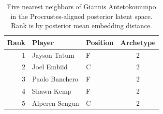 \begin{table}[htbp]
  \centering\small
  \begin{tabular}{rllc}
    \toprule
    Rank & Player & Position & Archetype \\
    \midrule
    1 & Jayson Tatum & F & 2 \\
    2 & Joel Embiid & C & 2 \\
    3 & Paolo Banchero & F & 2 \\
    4 & Shawn Kemp & F & 2 \\
    5 & Alperen Sengun & C & 2 \\
    \bottomrule
  \end{tabular}
  \caption{Five nearest neighbors of Giannis Antetokounmpo in the Procrustes-aligned posterior latent space. Rank is by posterior mean embedding distance.}
  \label{tab:Giannis_Antetokounmpo_neighbors}
\end{table}

